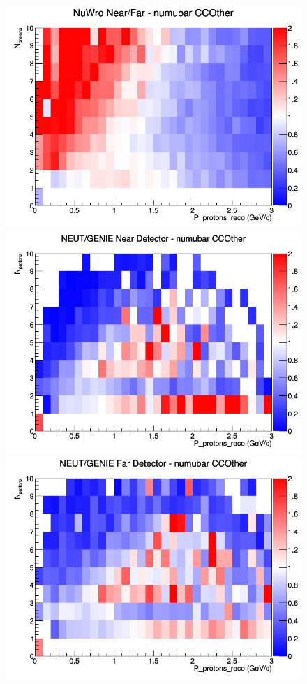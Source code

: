 \begin{figure}[h]
\endminipage
{}
\includegraphics[width=\linewidth]{eff_N_P/GAr/protons/ratios/CCOther_NuWro_numubar_NF_N_P.png}
\endminipage
\newline
{}
\includegraphics[width=\linewidth]{eff_N_P/GAr/protons/ratios/CCOther_NEUT_GENIE_numubar_near_N_P.png}
\endminipage
{}
\includegraphics[width=\linewidth]{eff_N_P/GAr/protons/ratios/CCOther_NEUT_GENIE_numubar_far_N_P.png}

\end{figure}
